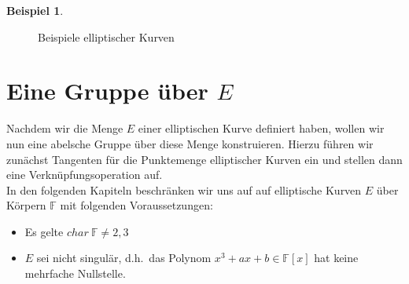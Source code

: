 \documentclass[hidelinks]{article}
\theoremstyle{plain}
\theoremstyle{definition}
\newtheorem{bsp}[thm]{Beispiel}
\theoremstyle{rem}
\begin{document}
\begin{sloppypar}
\begin{bsp}
\begin{figure}[H]
{}
        \qquad
        \caption{Beispiele elliptischer Kurven}
    \end{figure}
\end{bsp}
\section{Eine Gruppe über $E$}
Nachdem wir die Menge $E$ einer elliptischen Kurve definiert haben, wollen wir nun eine abelsche Gruppe über diese Menge konstruieren. Hierzu führen wir zunächst Tangenten für die Punktemenge elliptischer Kurven ein und stellen dann eine Verknüpfungsoperation auf.\\

In den folgenden Kapiteln beschränken wir uns auf auf elliptische Kurven $E$ über Körpern $\mathbb{F}$ mit folgenden Voraussetzungen:
\begin{itemize}
	\item Es gelte $char\ \mathbb{F}\ne2,3$
	\item $E$ sei nicht singulär, d.h.\ das Polynom $x^3+ax+b\in\mathbb{F}[x]$ hat keine mehrfache Nullstelle.
\end{itemize}

\end{sloppypar}
\end{document}

